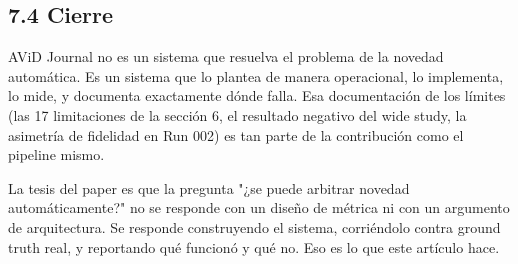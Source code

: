 \documentclass[12pt,a4paper]{article}
\theoremstyle{remark}
\begin{document}
\subsection{7.4 Cierre}

AViD Journal no es un sistema que resuelva el problema de la novedad automática. Es un sistema que lo plantea de manera operacional, lo implementa, lo mide, y documenta exactamente dónde falla. Esa documentación de los límites (las 17 limitaciones de la sección 6, el resultado negativo del wide study, la asimetría de fidelidad en Run 002) es tan parte de la contribución como el pipeline mismo.

La tesis del paper es que la pregunta "¿se puede arbitrar novedad automáticamente?" no se responde con un diseño de métrica ni con un argumento de arquitectura. Se responde construyendo el sistema, corriéndolo contra ground truth real, y reportando qué funcionó y qué no. Eso es lo que este artículo hace.
\end{document}
